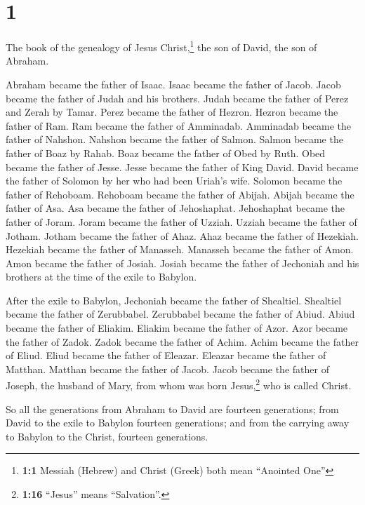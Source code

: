 \hypertarget{section}{%
\section{1}\label{section}}

 The book of the genealogy of Jesus Christ,\footnote{\textbf{1:1}
  Messiah (Hebrew) and Christ (Greek) both mean ``Anointed One''} the
son of David, the son of Abraham.

 Abraham became the father of Isaac. Isaac became the
father of Jacob. Jacob became the father of Judah and his brothers.
 Judah became the father of Perez and Zerah by Tamar.
Perez became the father of Hezron. Hezron became the father of Ram.
 Ram became the father of Amminadab. Amminadab became the
father of Nahshon. Nahshon became the father of Salmon. 
Salmon became the father of Boaz by Rahab. Boaz became the father of
Obed by Ruth. Obed became the father of Jesse.  Jesse
became the father of King David. David became the father of Solomon by
her who had been Uriah's wife.  Solomon became the father
of Rehoboam. Rehoboam became the father of Abijah. Abijah became the
father of Asa.  Asa became the father of Jehoshaphat.
Jehoshaphat became the father of Joram. Joram became the father of
Uzziah.  Uzziah became the father of Jotham. Jotham became
the father of Ahaz. Ahaz became the father of Hezekiah. 
Hezekiah became the father of Manasseh. Manasseh became the father of
Amon. Amon became the father of Josiah.  Josiah became
the father of Jechoniah and his brothers at the time of the exile to
Babylon.

 After the exile to Babylon, Jechoniah became the father
of Shealtiel. Shealtiel became the father of Zerubbabel. 
Zerubbabel became the father of Abiud. Abiud became the father of
Eliakim. Eliakim became the father of Azor.  Azor became
the father of Zadok. Zadok became the father of Achim. Achim became the
father of Eliud.  Eliud became the father of Eleazar.
Eleazar became the father of Matthan. Matthan became the father of
Jacob.  Jacob became the father of Joseph, the husband of
Mary, from whom was born Jesus,\footnote{\textbf{1:16} ``Jesus'' means
  ``Salvation''.} who is called Christ.

 So all the generations from Abraham to David are
fourteen generations; from David to the exile to Babylon fourteen
generations; and from the carrying away to Babylon to the Christ,
fourteen generations.

